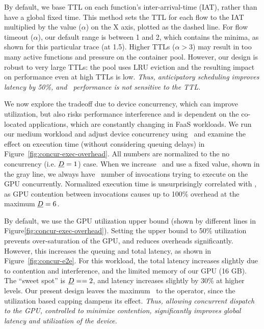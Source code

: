

By default, we base TTL on each function's inter-arrival-time (IAT), rather than have a global fixed time.
This method sets the TTL for each flow to the IAT multiplied by the value ($\alpha$) on the X axis, plotted as the dashed line.
For flow timeout ($\alpha$), our default range is between 1 and 2, which contains the minima, as shown for this particular trace (at 1.5).
Higher TTLs ($\alpha > 3$) may result in too many active functions and pressure on the container pool. However, our design is robust to very large TTLs: the pool uses LRU eviction and the resulting impact on performance even at high TTLs is low.
\emph{Thus, anticipatory scheduling improves latency by 50\%, and \QName~performance is not sensitive to the TTL.} 


We now explore the tradeoff due to device concurrency, which can improve utilization, but also risks performance interference and is dependent on the co-located applications, which are constantly changing in FaaS workloads. 
We run our medium workload and adjust device concurrency using \D~and examine the effect on execution time (without considering queuing delays) in Figure~\ref{fig:concur-exec-overhead}. 
All numbers are normalized to the no concurrency (i.e. $\emph{D}=1$) case. 
When we increase \D~and use a fixed value, shown in the gray line, we always have \D~number of invocations trying to execute on the GPU concurrently.
Normalized execution time is unsurprisingly correlated with \D, as GPU contention between invocations causes up to 100\% overhead at the maximum $\emph{D}=6$.


By default, we use the GPU utilization upper bound (shown by different lines in Figure\ref{fig:concur-exec-overhead}).
Setting the upper bound to 50\% utilization prevents over-saturation of the GPU, and reduces overheads significantly. 
However, this increases the queuing and total latency, as shown in Figure~\ref{fig:concur-e2e}.
For this workload, the total latency increases slightly due to contention and interference, and the limited memory of our GPU (16 GB).
The ``sweet spot'' is $\emph{D}==2$, and latency increases slightly by 30\% at higher levels.
Our present design leaves the maximum \D~to the operator, since the utilization based capping dampens its effect. 
\emph{Thus, allowing concurrent dispatch to the GPU, controlled to minimize contention, significantly improves global latency and utilization of the device.}

